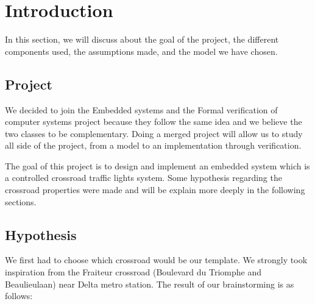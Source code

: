 \section{Introduction}
In this section, we will discuss about the goal of the project, the different components used, the assumptions made, and the model we have chosen.

\subsection{Project}

We decided to join the Embedded systems and the Formal verification of computer systems project because they follow the same idea and we believe the two classes to be complementary. Doing a merged project will allow us to study all side of the project, from a model to an implementation through verification.

The goal of this project is to design and implement an embedded system which is a controlled crossroad traffic lights system. Some hypothesis regarding the crossroad properties were made and will be explain more deeply in the following sections.

\subsection{Hypothesis}

We first had to choose which crossroad would be our template. We strongly took inspiration from the Fraiteur crossroad (Boulevard du Triomphe and Beaulieulaan) near Delta metro station. The result of our brainstorming is as follows:


